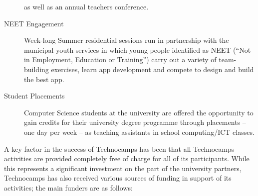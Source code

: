 \documentclass{sig-alternate}
\begin{document}
\begin{description}
as well as an annual teachers conference.
\item[NEET Engagement]
Week-long Summer residential sessions run in partnership with
the municipal youth services in which young people identified
as NEET (``Not in Employment, Education or Training'')
carry out a variety of team-building exercises,
learn app development and compete to design and build the best app.
\item[Student Placements]
Computer Science students at the university are offered
the opportunity to gain credits for their university degree programme through
placements -- one day per week -- as teaching assistants
in school computing/ICT classes.
\end{description}

A key factor in the success of Technocamps has been that all
Technocamps activities are provided completely free of charge for all
of its participants. While this represents a significant investment on
the part of the university partners, Technocamps has also received
various sources of funding in support of its activities; the main
funders are as follows:
\end{document}
